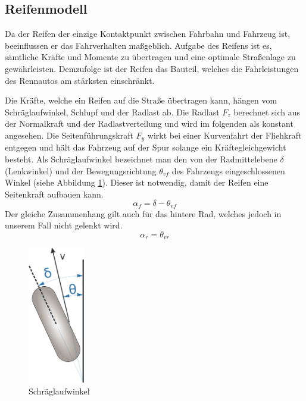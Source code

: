 \documentclass{like}
\begin{document}
\subsection{Reifenmodell}
\label{tireModel}
Da der Reifen der einzige Kontaktpunkt zwischen Fahrbahn und Fahrzeug ist,  beeinflussen er das Fahrverhalten maßgeblich. Aufgabe des Reifens ist es, sämtliche Kräfte und Momente zu übertragen und eine optimale Straßenlage zu gewährleisten. Demzufolge ist der Reifen das Bauteil, welches die Fahrleistungen des Rennautos am stärksten einschränkt.

Die Kräfte, welche ein Reifen auf die Straße übertragen kann, hängen vom Schräglaufwinkel, Schlupf und der Radlast ab. Die Radlast \(F_z\) berechnet sich aus der Normalkraft und der Radlastverteilung und wird im folgenden als konstant angesehen.
Die Seitenführungskraft \(F_y\) wirkt bei einer Kurvenfahrt der Fliehkraft entgegen und hält das Fahrzeug auf der Spur solange ein Kräftegleichgewicht besteht. Als Schräglaufwinkel bezeichnet man den von der Radmittelebene \(\delta\) (Lenkwinkel) und der Bewegungsrichtung \(\theta_{vf}\) des Fahrzeugs eingeschlossenen Winkel (siehe Abbildung \ref{fig:linLat}). Dieser ist notwendig, damit der Reifen eine Seitenkraft aufbauen kann. \\

\begin{equation}
\alpha_f = \delta - \theta_{vf}
\end{equation}
Der gleiche Zusammenhang gilt auch für das hintere Rad, welches jedoch in unserem Fall nicht gelenkt wird.
\begin{equation}
\alpha_r = \theta_{vr}
\end{equation}


\begin{figure}[ht!]
	\centering
	\includegraphics[width=70pt]{Abbildungen/slipAngle.png}
	\caption{Schräglaufwinkel}
	\label{fig:linLat}
\end{figure}
\end{document}
